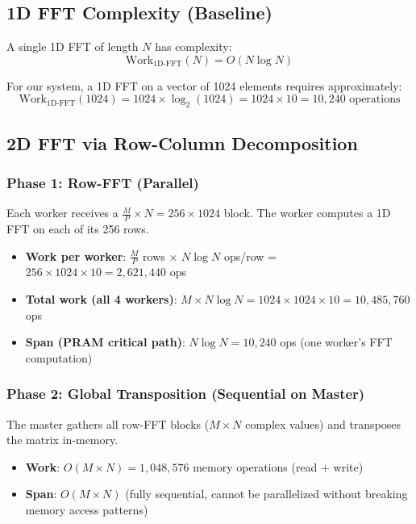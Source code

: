 \documentclass[11pt,a4paper]{article}
\theoremstyle{definition}
\begin{document}
\subsection{1D FFT Complexity (Baseline)}

A single 1D FFT of length $N$ has complexity:
\[
\text{Work}_{\text{1D-FFT}}(N) = O(N \log N)
\]

For our system, a 1D FFT on a vector of 1024 elements requires approximately:
\[
\text{Work}_{\text{1D-FFT}}(1024) = 1024 \times \log_2(1024) = 1024 \times 10 = 10{,}240 \text{ operations}
\]

\subsection{2D FFT via Row-Column Decomposition}

\subsubsection{Phase 1: Row-FFT (Parallel)}

Each worker receives a $\frac{M}{P} \times N = 256 \times 1024$ block. The worker computes a 1D FFT on each of its 256 rows.

\begin{itemize}
    \item \textbf{Work per worker}: $\frac{M}{P}$ rows $\times$ $N \log N$ ops/row = $256 \times 1024 \times 10 = 2{,}621{,}440$ ops
    \item \textbf{Total work (all 4 workers)}: $M \times N \log N = 1024 \times 1024 \times 10 = 10{,}485{,}760$ ops
    \item \textbf{Span (PRAM critical path)}: $N \log N = 10{,}240$ ops (one worker's FFT computation)
\end{itemize}

\subsubsection{Phase 2: Global Transposition (Sequential on Master)}

The master gathers all row-FFT blocks ($M \times N$ complex values) and transposes the matrix in-memory.

\begin{itemize}
    \item \textbf{Work}: $O(M \times N) = 1{,}048{,}576$ memory operations (read + write)
    \item \textbf{Span}: $O(M \times N)$ (fully sequential, cannot be parallelized without breaking memory access patterns)
\end{itemize}
\end{document}
